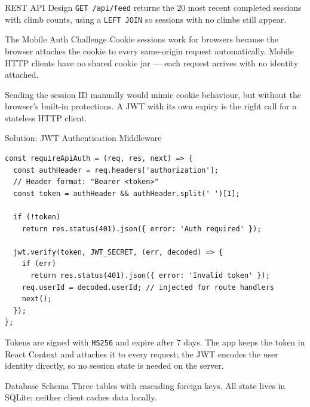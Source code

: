 \documentclass[final]{beamer}
\newlength{\colwidth}
\begin{document}
\begin{frame}[t,fragile]
\begin{columns}[t]
\begin{column}{\colwidth}
\begin{block}{REST API Design}
    \vspace{0.1cm}
    \texttt{GET /api/feed} returns the 20 most recent completed sessions with
    climb counts, using a \texttt{LEFT JOIN} so sessions with no climbs still
    appear.
  \end{block}

  \begin{alertblock}{The Mobile Auth Challenge}
    Cookie sessions work for browsers because the browser attaches the cookie
    to every same-origin request automatically. Mobile HTTP clients have no
    shared cookie jar --- each request arrives with no identity attached.

    \vspace{0.1cm}
    Sending the session ID manually would mimic cookie behaviour, but without
    the browser's built-in protections. A JWT with its own expiry is the right
    call for a stateless HTTP client.
  \end{alertblock}

  \begin{exampleblock}{Solution: JWT Authentication Middleware}

\begin{lstlisting}
const requireApiAuth = (req, res, next) => {
  const authHeader = req.headers['authorization'];
  // Header format: "Bearer <token>"
  const token = authHeader && authHeader.split(' ')[1];

  if (!token)
    return res.status(401).json({ error: 'Auth required' });

  jwt.verify(token, JWT_SECRET, (err, decoded) => {
    if (err)
      return res.status(401).json({ error: 'Invalid token' });
    req.userId = decoded.userId; // injected for route handlers
    next();
  });
};
\end{lstlisting}

    \vspace{0.1cm}
    Tokens are signed with \texttt{HS256} and expire after 7 days. The app
    keeps the token in React Context and attaches it to every request; the JWT
    encodes the user identity directly, so no session state is needed on the
    server.
  \end{exampleblock}

  \begin{block}{Database Schema}
    Three tables with cascading foreign keys. All state lives in SQLite;
    neither client caches data locally.


\end{block}
\end{column}
\end{columns}
\end{frame}
\end{document}
